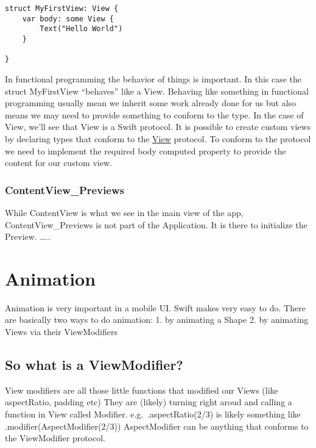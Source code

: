 \documentclass[]{article}
\begin{document}
\begin{verbatim}
struct MyFirstView: View {
    var body: some View {
        Text("Hello World")
    }

}
\end{verbatim}

In functional programming the behavior of things is important. In this
case the struct MyFirstView ``behaves'' like a View. Behaving like
something in functional programming usually mean we inherit some work
already done for us but also means we may need to provide something to
conform to the type. In the case of View, we'll see that View is a Swift
protocol. It is possible to create custom views by declaring types that
conform to the
\href{https://developer.apple.com/documentation/swiftui/view}{View}
protocol. To conform to the protocol we need to implement the required
body computed property to provide the content for our custom view.

\hypertarget{contentview_previews}{%
\subsubsection{ContentView\_Previews}\label{contentview_previews}}

While ContentView is what we see in the main view of the app,
ContentView\_Previews is not part of the Application. It is there to
initialize the Preview. \ldots{}..

\hypertarget{animation}{%
\section{Animation}\label{animation}}

Animation is very important in a mobile UI. Swift makes very easy to do.
There are basically two ways to do animation: 1. by animating a Shape 2.
by animating Views via their ViewModifiers

\hypertarget{so-what-is-a-viewmodifier}{%
\subsection{So what is a
ViewModifier?}\label{so-what-is-a-viewmodifier}}

View modifiers are all those little functions that modified our Views
(like aspectRatio, padding etc) They are (likely) turning right aroud
and calling a function in View called Modifier. e.g.~.aspectRatio(2/3)
is likely something like .modifier(AspectModifier(2/3)) AspectModifier
can be anything that conforms to the ViewModifier protocol.
\end{document}
